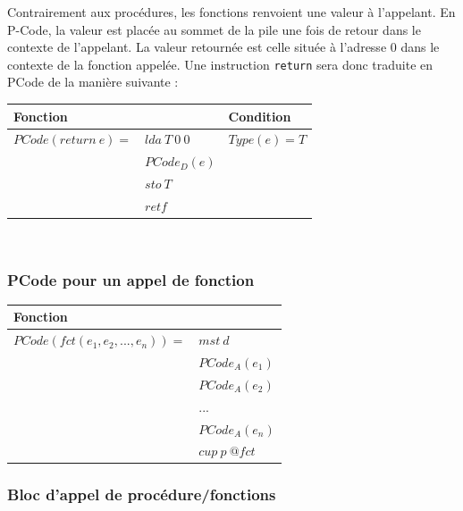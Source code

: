 \documentclass[french,11pt,twoside]{article}
\begin{document}
Contrairement aux procédures, les fonctions renvoient une valeur à l'appelant. En P-Code, la valeur est placée au sommet de la pile une fois de retour dans le contexte de l'appelant. La valeur retournée est celle située à l'adresse 0 dans le contexte de la fonction appelée. Une instruction \texttt{return} sera donc traduite en PCode de la manière suivante :

\begin{tabular}{| l l | l |}
\hline
Fonction                                 &                                   & Condition \\
\hline
$ PCode(return \  e)=$            & $ lda \ T \ 0 \ 0 $     &  $Type(e)=T$ \\
                                              & $ PCode_{D}(e) $        & \\
                                              & $ sto \ T $                 & \\
                                              & $ retf $                      & \\
\hline
\end{tabular}
\\



\subsubsection{PCode pour un appel de fonction}

\begin{tabular}{| l l |}
\hline
Fonction                                 &                                                                         \\
\hline
$PCode(fct(e_1, e_2, ..., e_n)) =$       & $mst\ d$ \\ 
                                                         & $PCode_A(e_1)$ \\
                                                         & $PCode_A(e_2)$ \\
                                                         & $...$ \\
                                                         & $PCode_A(e_n)$\\
                                                         & $cup\ p\ @fct$\\
\hline
\end{tabular}


\subsubsection{Bloc d'appel de procédure/fonctions}
\end{document}
